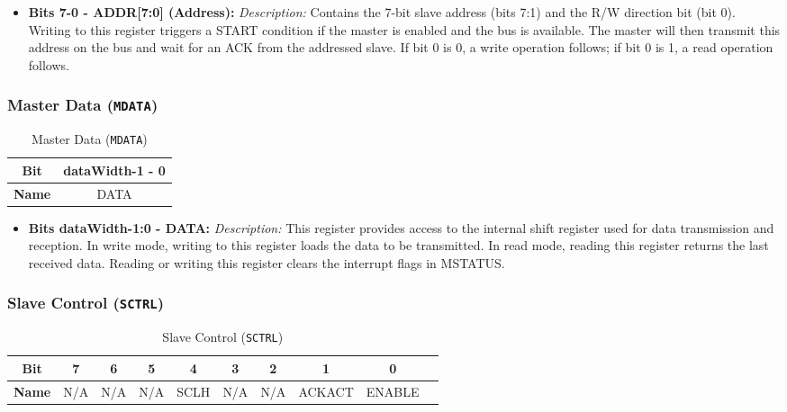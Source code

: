 \begin{itemize}
  
  \item \textbf{Bits 7-0 - ADDR[7:0] (Address):} 
  \textit{Description:} Contains the 7-bit slave address (bits 7:1) and the R/W direction bit (bit 0). Writing to this register triggers a START condition if the master is enabled and the bus is available. The master will then transmit this address on the bus and wait for an ACK from the addressed slave. If bit 0 is 0, a write operation follows; if bit 0 is 1, a read operation follows.
\end{itemize}

\subsubsection{Master Data (\texttt{MDATA})}
\label{sec:mdata}
  
\begin{table}[H]
  \centering
  \caption{Master Data (\texttt{MDATA})}
  \begin{tabular}{@{}cc@{}}
      \toprule
      \textbf{Bit} & dataWidth-1 - 0 \\ \midrule
      \textbf{Name} & DATA \\ \bottomrule
  \end{tabular}
  \label{tab:mdata}
\end{table}

\begin{itemize}
  
  \item \textbf{Bits dataWidth-1:0 - DATA:} 
  \textit{Description:} This register provides access to the internal shift register used for data transmission and reception. In write mode, writing to this register loads the data to be transmitted. In read mode, reading this register returns the last received data. Reading or writing this register clears the interrupt flags in MSTATUS.
\end{itemize}

\subsubsection{Slave Control (\texttt{SCTRL})}
\label{sec:sctrl}

\begin{table}[H]
    \centering
    \caption{Slave Control (\texttt{SCTRL})}
    \begin{tabular}{@{}cccccccccc@{}}
        \toprule
        \textbf{Bit} & 7 & 6 & 5 & 4 & 3 & 2 & 1 & 0 \\ \midrule
        \textbf{Name} & N/A & N/A & N/A & SCLH & N/A & N/A & ACKACT & ENABLE \\ \bottomrule
    \end{tabular}
    \label{tab:sctrl}
\end{table}

